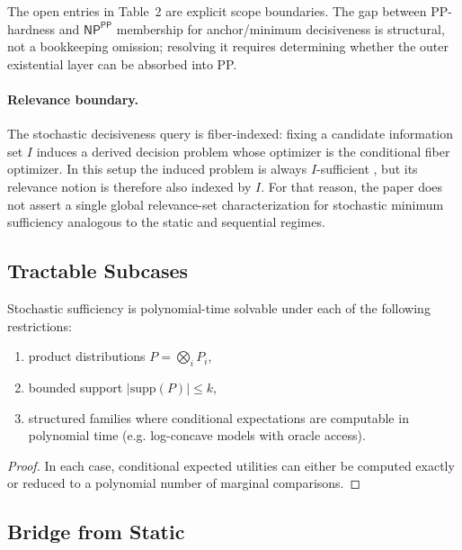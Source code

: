 The open entries in Table~2 are explicit scope boundaries. The gap between PP-hardness and $\textsf{NP}^{\textsf{PP}}$ membership for anchor/minimum decisiveness is structural, not a bookkeeping omission; resolving it requires determining whether the outer existential layer can be absorbed into PP.

\paragraph{Relevance boundary.}
The stochastic decisiveness query is fiber-indexed: fixing a candidate information set $I$
induces a derived decision problem whose optimizer is the conditional fiber
optimizer. In this setup the induced problem is always
$I$-sufficient , but its relevance notion is therefore also
indexed by $I$. For that reason, the paper does not assert a single global
relevance-set characterization for stochastic minimum sufficiency analogous to
the static and sequential regimes.

\subsection{Tractable Subcases}

\begin{proposition}\label{prop:stochastic-tractable}
Stochastic sufficiency is polynomial-time solvable under each of the following restrictions:
\begin{enumerate}
\item product distributions $P=\bigotimes_i P_i$,
\item bounded support $|\mathrm{supp}(P)|\le k$,
\item structured families where conditional expectations are computable in polynomial time (e.g. log-concave models with oracle access).
\end{enumerate}
\end{proposition}


\begin{proof}
In each case, conditional expected utilities can either be computed exactly or reduced to a polynomial number of marginal comparisons.
\end{proof}

\subsection{Bridge from Static}

